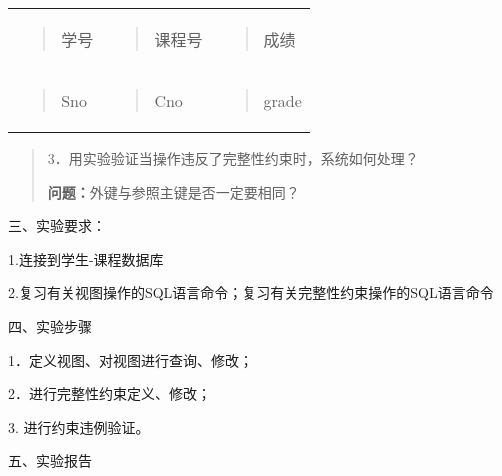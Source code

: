 \documentclass[
]{article}
\begin{document}
\begin{longtable}[]{@{}lll@{}}
\toprule
\endhead
\begin{minipage}[t]{0.30\columnwidth}\raggedright
\begin{quote}
学号
\end{quote}\strut
\end{minipage} & \begin{minipage}[t]{0.30\columnwidth}\raggedright
\begin{quote}
课程号
\end{quote}\strut
\end{minipage} & \begin{minipage}[t]{0.30\columnwidth}\raggedright
\begin{quote}
成绩
\end{quote}\strut
\end{minipage}\tabularnewline
\begin{minipage}[t]{0.30\columnwidth}\raggedright
\begin{quote}
Sno
\end{quote}\strut
\end{minipage} & \begin{minipage}[t]{0.30\columnwidth}\raggedright
\begin{quote}
Cno
\end{quote}\strut
\end{minipage} & \begin{minipage}[t]{0.30\columnwidth}\raggedright
\begin{quote}
grade
\end{quote}\strut
\end{minipage}\tabularnewline
\bottomrule
\end{longtable}

\begin{quote}
3．用实验验证当操作违反了完整性约束时，系统如何处理？

\textbf{问题：}外键与参照主键是否一定要相同？
\end{quote}

三、实验要求：

1.连接到学生-课程数据库

2.复习有关视图操作的SQL语言命令；复习有关完整性约束操作的SQL语言命令

四、实验步骤

1．定义视图、对视图进行查询、修改；

2．进行完整性约束定义、修改；

3. 进行约束违例验证。

五、实验报告
\end{document}

